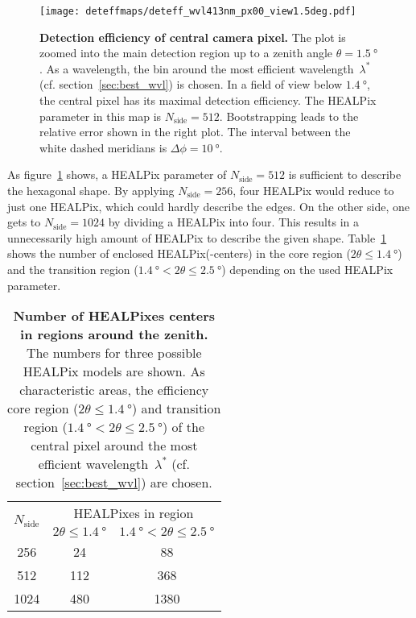 \begin{figure}[H]
	\centering
	\texttt{[image: deteffmaps/deteff\_wvl413nm\_px00\_view1.5deg.pdf]}
	\caption[Detection efficiency of central camera pixel]{\textbf{Detection efficiency of central camera pixel.} The plot is zoomed into the main detection region up to a zenith angle $\theta=\SI{1.5}{\degree}$. As a wavelength, the bin around the most efficient wavelength~$\lambda^\ast$ (cf. section~\ref{sec:best_wvl}) is chosen. In a field of view below $\SI{1.4}{\degree}$, the central pixel has its maximal detection efficiency. The HEALPix parameter in this map is $N_\text{side}=\num{512}$. Bootstrapping leads to the relative error shown in the right plot. The interval between the white dashed meridians is $\Delta\phi=\SI{10}{\degree}$.}
	\label{deteffmap:px0}
\end{figure}

As figure~\ref{deteffmap:px0} shows, a HEALPix parameter of $N_\text{side}=\num{512}$ is sufficient to describe the hexagonal shape. By applying $N_\text{side}=\num{256}$, four HEALPix would reduce to just one HEALPix, which could hardly describe the edges. On the other side, one gets to $N_\text{side}=\num{1024}$ by dividing a HEALPix into four. This results in a unnecessarily high amount of HEALPix to describe the given shape. Table~\ref{n_healpix_fov} shows the number of enclosed HEALPix(-centers) in the core region ($2\theta\leq\SI{1.4}{\degree}$) and the transition region ($\SI{1.4}{\degree} < 2\theta \leq \SI{2.5}{\degree}$) depending on the used HEALPix parameter.

\begin{table}[H]
	\centering
	\begin{tabular}{c|c|c}
		\toprule
		\multirow{2}{*}{$N_\text{side}$} & \multicolumn{2}{c}{HEALPixes in region} \\
		&	$2\theta\leq\SI{1.4}{\degree}$ & $\SI{1.4}{\degree} < 2\theta \leq \SI{2.5}{\degree}$ \\
		\midrule
		\num{256}  & \num{24}  & \num{88} \\
		\num{512}  & \num{112} & \num{368} \\
		\num{1024} & \num{480} & \num{1380} \\
		\bottomrule
	\end{tabular}
	\caption[Number of HEALPixes centers in regions around the zenith]{\textbf{Number of HEALPixes centers in regions around the zenith.} The numbers for three possible HEALPix models are shown. As characteristic areas, the efficiency core region ($2\theta\leq\SI{1.4}{\degree}$) and transition region ($\SI{1.4}{\degree} < 2\theta \leq \SI{2.5}{\degree}$) of the central pixel around the most efficient wavelength~$\lambda^\ast$ (cf. section~\ref{sec:best_wvl}) are chosen.}
	\label{n_healpix_fov}
\end{table}

